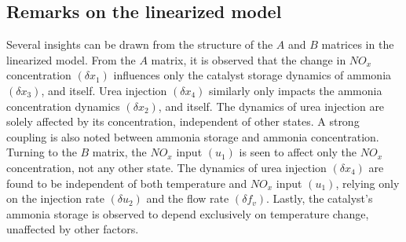 \subsection{Remarks on the linearized model}

Several insights can be drawn from the structure of the $A$ and $B$ matrices in
the linearized model. From the $A$ matrix, it is observed that the change in
$NO_x$ concentration $(\delta x_1)$ influences only the catalyst storage
dynamics of ammonia $(\delta x_3)$, and itself. Urea injection $(\delta x_4)$
similarly only impacts the ammonia concentration dynamics $(\delta x_2)$, and
itself. The dynamics of urea injection are solely affected by its
concentration, independent of other states. A strong coupling is also noted
between ammonia storage and ammonia concentration. Turning to the $B$ matrix,
the $NO_x$ input $(u_1)$ is seen to affect only the $NO_x$ concentration, not
any other state. The dynamics of urea injection $(\delta x_4)$ are found to be
independent of both temperature and $NO_x$ input $(u_1)$, relying only on the
injection rate $(\delta u_2)$ and the flow rate $(\delta f_v)$. Lastly, the
catalyst's ammonia storage is observed to depend exclusively on temperature
change, unaffected by other factors.
